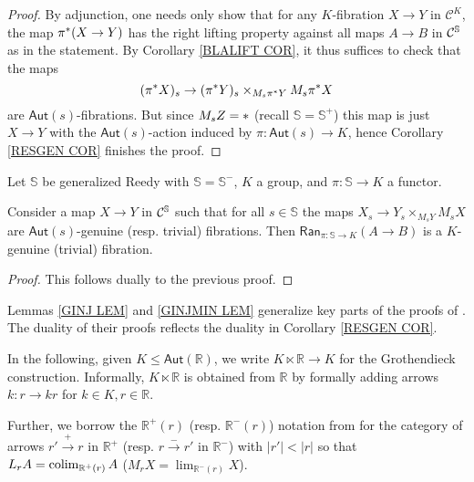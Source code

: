 \documentclass[a4paper,10pt
]{article}%
\begin{document}
\begin{proof}
By adjunction, one needs only show that for any 
$K$-fibration $X \to Y$ in $\mathcal{C}^K$,
the map $\pi^{\**}(X \to Y)$
has the right lifting property against all maps $A \to B$ in $\mathcal{C}^{\mathbb{S}}$ as in the statement.
By Corollary \ref{BLALIFT COR}, it thus suffices to check
that the maps
\[
	(\pi^{\**} X)_s \to 
	(\pi^{\**} Y)_s \times_{M_s \pi^{\**} Y} M_s \pi^{\**} X
\]
are $\mathsf{Aut}(s)$-fibrations. But since $M_s Z = \**$ 
(recall $\mathbb{S}=\mathbb{S}^+$)
this map is just $X \to Y$ with the $\mathsf{Aut}(s)$-action induced by
$\pi \colon \mathsf{Aut}(s) \to K$, hence 
Corollary \ref{RESGEN COR} finishes the proof.
\end{proof}


\begin{lemma}\label{GINJMIN LEM}
Let $\mathbb{S}$ be generalized Reedy with $\mathbb{S}=\mathbb{S}^-$, $K$ a group, and $\pi \colon \mathbb{S} \to K$ a functor.

Consider a map $X \to Y$ in $\mathcal{C}^{\mathbb{S}}$ such that for all 
$s \in \mathbb{S}$
the maps 
$
	X_s \to Y_s \times_{M_s Y} M_s X
$	
are $\mathsf{Aut}(s)$-genuine (resp. trivial) fibrations.
Then 
$\mathsf{Ran}_{\pi\colon \mathbb{S} \to K}(A \to B)$
is a $K$-genuine (trivial) fibration.
\end{lemma}

\begin{proof}
This follows dually to the previous proof.
\end{proof}

\begin{remark}
Lemmas \ref{GINJ LEM} and \ref{GINJMIN LEM} generalize key parts of the proofs of \cite[Lemmas 5.3 and 5.5]{BM11}.  
The duality of their proofs reflects the duality in 
Corollary \ref{RESGEN COR}.
\end{remark}

In the following, given $K \leq \mathsf{Aut}(\mathbb{R})$,
we write $K \ltimes \mathbb{R} \to K$ for the Grothendieck construction. Informally, 
$K \ltimes \mathbb{R}$ is obtained from $\mathbb{R}$
by formally adding arrows $k \colon r \to k r$ for 
$k\in K, r \in \mathbb{R}$.

Further, we borrow the $\mathbb{R}^+(r)$ (resp. $\mathbb{R}^-(r)$) notation from \cite{BM11} for
the category of arrows
$r' \xrightarrow{+} r$ in $\mathbb{R}^+$
(resp. 
$r \xrightarrow{-} r'$ in $\mathbb{R}^-$)
with $|r'|<|r|$
so that
$L_r A = \mathop{\operatorname{colim}}_{\mathbb{R}^+(r)}A$
($M_r X = \mathop{\lim}_{\mathbb{R}^-(r)}X$).
\end{document}
